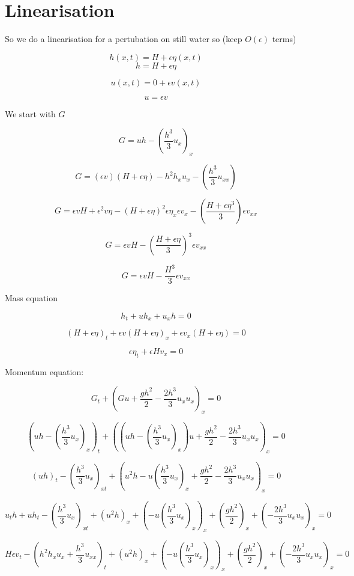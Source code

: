 \documentclass[12pt]{article}
\begin{document}
\section{Linearisation}

So we do a linearisation for a pertubation on still water so (keep $O(\epsilon)$ terms)

\[h(x,t) = H + \epsilon\eta(x,t)\]
\[h = H + \epsilon\eta\]

\[u(x,t) = 0 + \epsilon v(x,t)\]

\[u =  \epsilon v\]

We start with $G$

\[G = uh - \left(\frac{h^3}{3} u_x\right)_x\]

\[G = \left(\epsilon v\right)\left(H + \epsilon\eta\right) - h^2h_x u_x  - \left(\frac{h^3}{3} u_{xx}\right)\]

\[G = \epsilon v H + \epsilon^2 v \eta  - \left(H + \epsilon\eta\right)^2 \epsilon\eta_x \epsilon v_x  - \left( \frac{H + \epsilon\eta^3}{3} \right) \epsilon v_{xx}\]

\[G = \epsilon v H   - \left( \frac{H + \epsilon\eta}{3} \right)^3 \epsilon v_{xx}\]

\[G = \epsilon v H   -  \frac{H^3}{3} \epsilon v_{xx}\]

Mass equation

\[h_t + uh_x + u_xh = 0\]
 

\[\left(H + \epsilon\eta\right)_t + \epsilon v\left(H + \epsilon\eta\right)_x + \epsilon v_x\left(H + \epsilon\eta\right) = 0\]

\[\epsilon\eta_t + \epsilon H v_x = 0\]

Momentum equation:

\[G_t + \left(Gu + \frac{gh^2}{2} - \frac{2h^3}{3} u_x u_x\right)_x = 0\]

\[\left(uh - \left(\frac{h^3}{3} u_x\right)_x\right)_t + \left(\left(uh - \left(\frac{h^3}{3} u_x\right)_x\right)u + \frac{gh^2}{2} - \frac{2h^3}{3} u_x u_x\right)_x = 0\]

\[\left(uh\right)_t - \left(\frac{h^3}{3} u_x\right)_{xt} + \left(u^2h - u\left(\frac{h^3}{3} u_x\right)_x + \frac{gh^2}{2} - \frac{2h^3}{3} u_x u_x\right)_x = 0\]

\[u_th + uh_t- \left(\frac{h^3}{3} u_x\right)_{xt} + \left(u^2h\right)_x + \left(- u\left(\frac{h^3}{3} u_x\right)_x \right)_x + \left(\frac{gh^2}{2} \right)_x + \left( - \frac{2h^3}{3} u_x u_x\right)_x = 0\]

\[H\epsilon v_t - \left(h^2h_x u_x +\frac{h^3}{3} u_{xx} \right)_{t} + \left(u^2h\right)_x + \left(- u\left(\frac{h^3}{3} u_x\right)_x \right)_x + \left(\frac{gh^2}{2} \right)_x + \left( - \frac{2h^3}{3} u_x u_x\right)_x = 0\]
\end{document}
